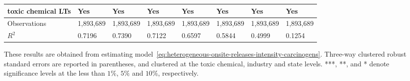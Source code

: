 \begin{table}[H]
{\begin{tabular}{@{}llllllll@{}}
            toxic chemical LTs              & Yes       & Yes           & Yes       & Yes          & Yes             & Yes           & Yes                 \\ \midrule \midrule
            Observations                    & 1,893,689 & 1,893,689     & 1,893,689 & 1,893,689    & 1,893,689       & 1,893,689     & 1,893,689           \\
            $R^2$                           & 0.7196    & 0.7390        & 0.7122    & 0.6597       & 0.5844          & 0.4999        & 0.1254              \\ \bottomrule\bottomrule
        \end{tabular}%
    }
    \begin{minipage}{18cm}
        \vspace{0.05in}
        These results are obtained from estimating model~\ref{eq:heterogeneous-onsite-releases-intensity-carcinogens}. Three-way clustered robust standard errors are reported in parentheses, and clustered at the toxic chemical, industry and state levels. ***, **, and * denote significance levels at the less than $1\%$, $5\%$ and $10\%$, respectively.
    \end{minipage}
\end{table}